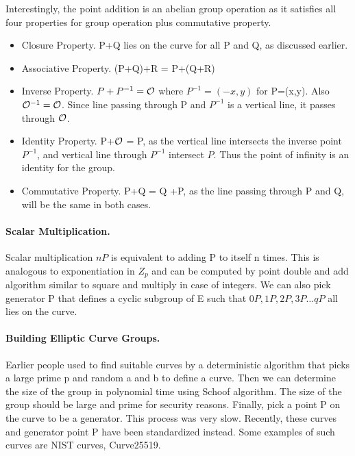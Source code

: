 Interestingly, the point addition is an abelian group operation as it satisfies all four properties for group operation plus commutative property.
\begin{itemize}
\item Closure Property. P+Q lies on the curve for all P and Q, as discussed earlier.
\item Associative Property. (P+Q)+R = P+(Q+R)
\item Inverse Property. $P + P^{-1} = \cal O $ where $P^{-1} = (-x,y)$ for P=(x,y). Also ${\cal O}^{-1} = \cal O$. Since line passing through P and $P^{-1}$ is a vertical line, it passes through $\cal O$.
\item Identity Property. P+$\cal O$ = P, as the vertical line intersects the inverse point $P^{-1}$, and vertical line through $P^{-1}$ intersect $P$. Thus the point of infinity is an identity for the group.
\item Commutative Property. P+Q = Q +P, as the line passing through P and Q, will be the same in both cases.
\end{itemize}

\paragraph{Scalar Multiplication.} Scalar multiplication $nP$ is equivalent to adding P to itself n times. This is analogous to exponentiation in $Z_p$ and can be computed by point double and add algorithm similar to square and multiply in case of integers. We can also pick generator P that defines a cyclic subgroup of E such that $0P, 1P, 2P, 3P \dots qP$ all lies on the curve. 

\paragraph{Building Elliptic Curve Groups.} Earlier people used to find suitable curves by a deterministic algorithm that picks a large prime p and random a and b to define a curve. Then we can determine the size of the group in polynomial time using Schoof algorithm. The size of the group should be large and prime for security reasons. Finally, pick a point P on the curve to be a generator. This process was very slow. Recently, these curves and generator point P have been standardized instead. Some examples of such curves are NIST curves, Curve25519. 






